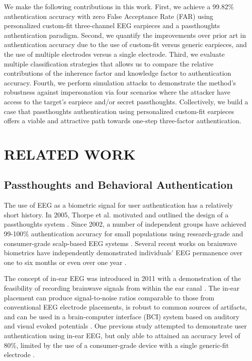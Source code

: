 \documentclass[a4paper,twoside]{article}
\begin{document}
We make the following contributions in this work. First, we achieve a 99.82\% authentication accuracy with zero False Acceptance Rate (FAR) using personalized custom-fit three-channel EEG earpieces and a passthoughts authentication paradigm. Second, we quantify the improvements over prior art in authentication accuracy due to the use of custom-fit versus generic earpieces, and the use of multiple electrodes versus a single electrode. Third, we evaluate multiple classification strategies that allows us to compare the relative contributions of the inherence factor and knowledge factor to authentication accuracy. Fourth, we perform simulation attacks to demonstrate the method's robustness against impersonation via four scenarios where the attacker have access to the target's earpiece and/or secret passthoughts. Collectively, we build a case that passthoughts authentication using personalized custom-fit earpieces offers a viable and attractive path towards one-step three-factor authentication.

\section{\uppercase{Related Work}}
\label{sec:relatedwork}

\subsection{Passthoughts and Behavioral Authentication}

\noindent The use of EEG as a biometric signal for user authentication has a relatively short history.
In 2005, Thorpe et al. motivated and outlined the design of a passthoughts system \cite{Thorpe2005}.
Since 2002, a number of independent groups have achieved 99-100\% authentication accuracy for small populations using research-grade and consumer-grade scalp-based EEG systems \cite{Poulos2002,Marcel2007a,Ashby2011,Chuang2013b}. Several recent works on brainwave biometrics have independently demonstrated individuals' EEG permanence over one to six months \cite{Armstrong2015,Maiorana2016} or even over one year \cite{Ruiz2017}. 

The concept of in-ear EEG was introduced in 2011 with a demonstration of the feasibility of recording brainwave signals from within the ear canal \cite{Looney2011}. The in-ear placement can produce signal-to-noise ratios comparable to those from conventional EEG electrode placements, is robust to common sources of artifacts, and can be used in a brain-computer interface (BCI) system based on auditory and visual evoked potentials \cite{Kidmose2013a}. One previous study attempted to demonstrate user authentication using in-ear EEG, but only able to attained an accuracy level of 80\%, limited by the use of a consumer-grade device with a single generic-fit electrode \cite{curran2016passthoughts}.
\end{document}
